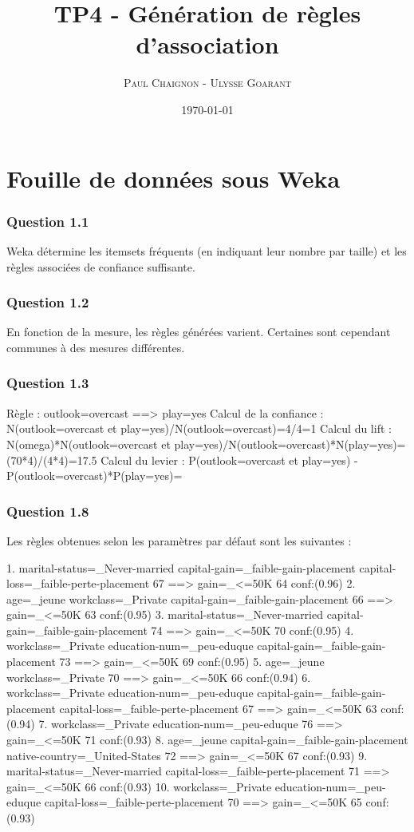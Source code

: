 \documentclass[a4paper,12pt]{article}
\title{TP4 - Génération de règles d'association}
\author{\textsc{Paul Chaignon} - \textsc{Ulysse Goarant}}
\date{\today}
\begin{document}
\maketitle

\section{Fouille de données sous Weka}

\subsubsection*{Question 1.1}

Weka détermine les itemsets fréquents (en indiquant leur nombre par taille) et les règles associées de confiance suffisante.


\subsubsection*{Question 1.2}

En fonction de la mesure, les règles générées varient.
Certaines sont cependant communes à des mesures différentes.


\subsubsection*{Question 1.3}

Règle : outlook=overcast ==> play=yes
Calcul de la confiance : N(outlook=overcast et play=yes)/N(outlook=overcast)=4/4=1
Calcul du lift : N(omega)*N(outlook=overcast et play=yes)/N(outlook=overcast)*N(play=yes)=(70*4)/(4*4)=17.5
Calcul du levier : P(outlook=overcast et play=yes) - P(outlook=overcast)*P(play=yes)=


\subsubsection*{Question 1.8}

Les règles obtenues selon les paramètres par défaut sont les suivantes :

 1.  marital-status=_Never-married  capital-gain=_faible-gain-placement  capital-loss=_faible-perte-placement 67 ==>  gain=_<=50K 64    conf:(0.96)
 2. age=_jeune  workclass=_Private  capital-gain=_faible-gain-placement 66 ==>  gain=_<=50K 63    conf:(0.95)
 3.  marital-status=_Never-married  capital-gain=_faible-gain-placement 74 ==>  gain=_<=50K 70    conf:(0.95)
 4.  workclass=_Private  education-num=_peu-eduque  capital-gain=_faible-gain-placement 73 ==>  gain=_<=50K 69    conf:(0.95)
 5. age=_jeune  workclass=_Private 70 ==>  gain=_<=50K 66    conf:(0.94)
 6.  workclass=_Private  education-num=_peu-eduque  capital-gain=_faible-gain-placement  capital-loss=_faible-perte-placement 67 ==>  gain=_<=50K 63    conf:(0.94)
 7.  workclass=_Private  education-num=_peu-eduque 76 ==>  gain=_<=50K 71    conf:(0.93)
 8. age=_jeune  capital-gain=_faible-gain-placement  native-country=_United-States 72 ==>  gain=_<=50K 67    conf:(0.93)
 9.  marital-status=_Never-married  capital-loss=_faible-perte-placement 71 ==>  gain=_<=50K 66    conf:(0.93)
10.  workclass=_Private  education-num=_peu-eduque  capital-loss=_faible-perte-placement 70 ==>  gain=_<=50K 65    conf:(0.93)
\end{document}
